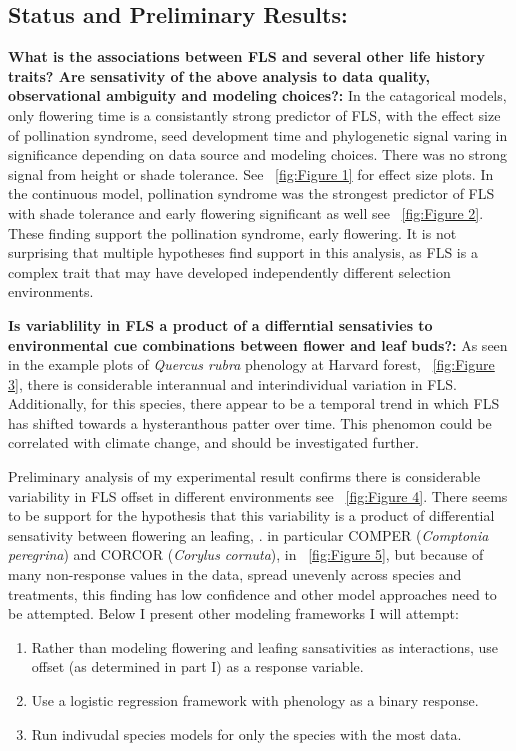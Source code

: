 \documentclass{article}\usepackage[]{graphicx}\usepackage[]{color}
\begin{document}
\subsection*{Status and Preliminary Results:}
\indent\textbf{What is the associations between FLS and several other life history traits?  Are sensativity of the above analysis to data quality, observational ambiguity and modeling choices?:} In the catagorical models, only flowering time is a consistantly strong predictor of FLS, with the effect size of pollination syndrome, seed development time and phylogenetic signal varing in significance depending on data source and modeling choices. There was no strong signal from height or shade tolerance. See ~\ref{fig:Figure 1} for effect size plots.
In the continuous model, pollination syndrome was the strongest predictor of FLS with shade tolerance and early flowering significant as well see ~\ref{fig:Figure 2}. These finding support the pollination syndrome, early flowering. It is not surprising that multiple hypotheses find support in this analysis, as FLS is a complex trait that may have developed independently different selection environments.
\par\textbf{Is variablility in FLS a product of a differntial sensativies to environmental cue combinations between flower and leaf buds?:} As seen in the  example plots of \textit{Quercus rubra} phenology at Harvard forest, ~\ref{fig:Figure 3}, there is considerable interannual and interindividual variation in FLS. Additionally, for this species, there appear to be a temporal trend in which FLS has shifted towards a hysteranthous patter over time. This phenomon could be correlated with climate change, and should be investigated further.
\par Preliminary analysis of my experimental result confirms there is considerable variability in FLS offset in different environments see ~\ref{fig:Figure 4}.  There seems to be support for the hypothesis that this variability is a product of differential sensativity between flowering an leafing, . in particular COMPER (\textit{Comptonia peregrina}) and CORCOR (\textit{Corylus cornuta}), in ~\ref{fig:Figure 5}, but because of many non-response values in the data, spread unevenly across species and treatments, this finding has low confidence and other model approaches need to be attempted. Below I present other modeling frameworks I will attempt:
\begin{enumerate}
\item Rather than modeling flowering and leafing sansativities as interactions, use offset (as determined in part I) as a response variable.
\item Use a logistic regression framework with phenology as a binary response.
\item Run indivudal species models for only the species with the most data.
\end{enumerate}
\end{document}
